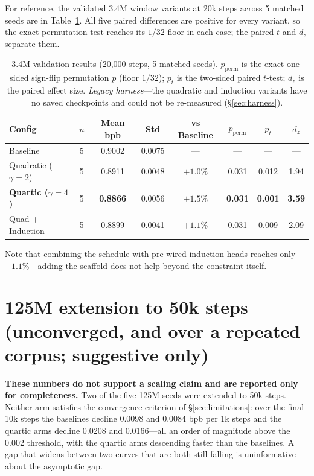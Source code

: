 \documentclass[11pt,a4paper]{article}
\begin{document}
For reference, the validated 3.4M window variants at 20k steps across 5 matched seeds are in Table~\ref{tab:3_4m}. All five paired differences are positive for every variant, so the exact permutation test reaches its $1/32$ floor in each case; the paired $t$ and $d_z$ separate them.

\begin{table}[H]
\centering
\caption{3.4M validation results (20{,}000 steps, 5 matched seeds). $p_{\text{perm}}$ is the exact one-sided sign-flip permutation $p$ (floor $1/32$); $p_t$ is the two-sided paired $t$-test; $d_z$ is the paired effect size. \emph{Legacy harness}---the quadratic and induction variants have no saved checkpoints and could not be re-measured (\S\ref{sec:harness}).}
\label{tab:3_4m}
\begin{tabular}{lccccccc}
\toprule
Config & $n$ & Mean bpb & Std & vs Baseline & $p_{\text{perm}}$ & $p_t$ & $d_z$ \\
\midrule
Baseline & 5 & 0.9002 & 0.0075 & --- & --- & --- & --- \\
Quadratic ($\gamma=2$) & 5 & 0.8911 & 0.0048 & $+1.0$\% & 0.031 & 0.012 & 1.94 \\
\textbf{Quartic ($\gamma=4$)} & 5 & \textbf{0.8866} & 0.0056 & $\mathbf{+1.5}$\% & \textbf{0.031} & \textbf{0.001} & \textbf{3.59} \\
Quad + Induction & 5 & 0.8899 & 0.0041 & $+1.1$\% & 0.031 & 0.009 & 2.09 \\
\bottomrule
\end{tabular}
\end{table}

Note that combining the schedule with pre-wired induction heads reaches only $+1.1$\%---adding the scaffold does not help beyond the constraint itself.

\section{125M extension to 50k steps (unconverged, and over a repeated corpus; suggestive only)}
\label{app:125m50k}

\textbf{These numbers do not support a scaling claim and are reported only for completeness.} Two of the five 125M seeds were extended to 50k steps. Neither arm satisfies the convergence criterion of \S\ref{sec:limitations}: over the final 10k steps the baselines decline 0.0098 and 0.0084 bpb per 1k steps and the quartic arms decline 0.0208 and 0.0166---all an order of magnitude above the 0.002 threshold, with the quartic arms descending faster than the baselines. A gap that widens between two curves that are both still falling is uninformative about the asymptotic gap.
\end{document}
